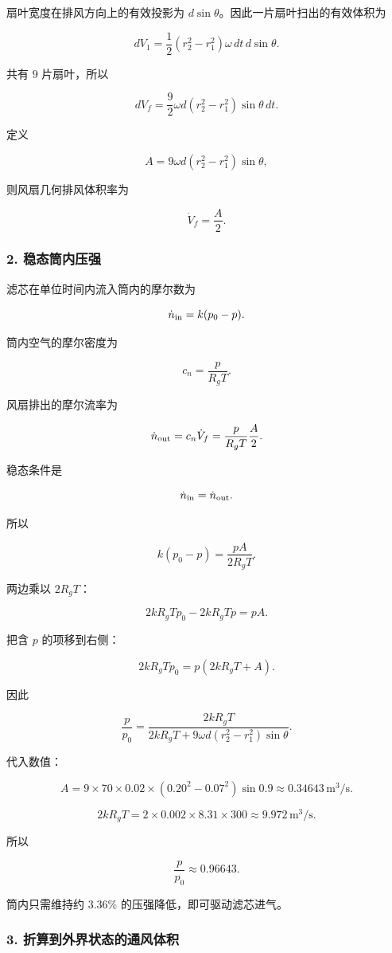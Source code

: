 \documentclass[12pt,a4paper,UTF8]{ctexart}
\begin{document}
扇叶宽度在排风方向上的有效投影为
\(d\sin\theta\)。因此一片扇叶扫出的有效体积为

\[
dV_1=\frac12(r_2^2-r_1^2)\omega\,dt\,d\sin\theta.
\]

共有 \(9\) 片扇叶，所以

\[
dV_f=\frac92\omega d(r_2^2-r_1^2)\sin\theta\,dt.
\]

定义

\[
A=9\omega d(r_2^2-r_1^2)\sin\theta,
\]

则风扇几何排风体积率为

\[
\boxed{\dot V_f=\frac{A}{2}}.
\]

\subsubsection{2.
稳态筒内压强}\label{ux7a33ux6001ux7b52ux5185ux538bux5f3a}

滤芯在单位时间内流入筒内的摩尔数为

\[
\dot n_{\rm in}=k(p_0-p).
\]

筒内空气的摩尔密度为

\[
c_n=\frac{p}{R_gT}.
\]

风扇排出的摩尔流率为

\[
\dot n_{\rm out}=c_n\dot V_f
=\frac{p}{R_gT}\frac{A}{2}.
\]

稳态条件是

\[
\dot n_{\rm in}=\dot n_{\rm out}.
\]

所以

\[
k(p_0-p)=\frac{pA}{2R_gT}.
\]

两边乘以 \(2R_gT\)：

\[
2kR_gTp_0-2kR_gTp=pA.
\]

把含 \(p\) 的项移到右侧：

\[
2kR_gTp_0=p(2kR_gT+A).
\]

因此

\[
\boxed{
\frac{p}{p_0}
=\frac{2kR_gT}
{2kR_gT+9\omega d(r_2^2-r_1^2)\sin\theta}
}.
\]

代入数值：

\[
A=9\times70\times0.02\times(0.20^2-0.07^2)\sin0.9
\approx0.34643\,\mathrm{m^3/s}.
\]

\[
2kR_gT=2\times0.002\times8.31\times300
\approx9.972\,\mathrm{m^3/s}.
\]

所以

\[
\boxed{\frac{p}{p_0}\approx0.96643}.
\]

筒内只需维持约 \(3.36\%\) 的压强降低，即可驱动滤芯进气。

\subsubsection{3.
折算到外界状态的通风体积}\label{ux6298ux7b97ux5230ux5916ux754cux72b6ux6001ux7684ux901aux98ceux4f53ux79ef}
\end{document}
